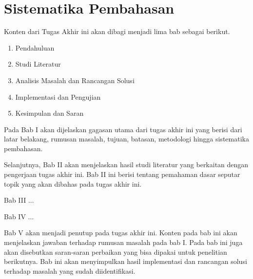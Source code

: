 \section{Sistematika Pembahasan}

Konten dari Tugas Akhir ini akan dibagi menjadi lima bab sebagai berikut.
\begin{enumerate}
    \item Pendahuluan
    \item Studi Literatur
    \item Analisis Masalah dan Rancangan Solusi
    \item Implementasi dan Pengujian
    \item Kesimpulan dan Saran
\end{enumerate}

Pada Bab I akan dijelaskan gagasan utama dari tugas akhir ini yang berisi dari latar belakang, rumusan masalah, tujuan, batasan, metodologi hingga sistematika pembahasan.

Selanjutnya, Bab II akan menjelaskan hasil studi literatur yang berkaitan dengan pengerjaan tugas akhir ini. Bab II ini berisi tentang pemahaman dasar seputar topik yang akan dibahas pada tugas akhir ini.

Bab III ...

Bab IV ...

Bab V akan menjadi penutup pada tugas akhir ini. Konten pada bab ini akan menjelaskan jawaban terhadap rumusan masalah pada bab I. Pada bab ini juga akan disebutkan saran-saran perbaikan yang bisa dipakai untuk penelitian berikutnya. Bab ini akan menyimpulkan hasil implementasi dan rancangan solusi terhadap masalah yang sudah diidentifikasi.